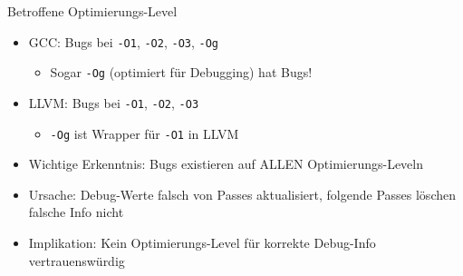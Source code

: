 ﻿\documentclass{beamer}
\begin{document}
\begin{frame}{Betroffene Optimierungs-Level}
  \begin{itemize}
    \item GCC: Bugs bei \texttt{-O1}, \texttt{-O2}, \texttt{-O3}, \texttt{-Og}
      \begin{itemize}
        \item Sogar \texttt{-Og} (optimiert f\"ur Debugging) hat Bugs!
      \end{itemize}
    \item LLVM: Bugs bei \texttt{-O1}, \texttt{-O2}, \texttt{-O3}
      \begin{itemize}
        \item \texttt{-Og} ist Wrapper f\"ur \texttt{-O1} in LLVM
      \end{itemize}
    \item Wichtige Erkenntnis: Bugs existieren auf ALLEN Optimierungs-Leveln
    \item Ursache: Debug-Werte falsch von Passes aktualisiert, folgende Passes l\"oschen falsche Info nicht
    \item Implikation: Kein Optimierungs-Level f\"ur korrekte Debug-Info vertrauensw\"urdig
  \end{itemize}
\end{frame}
\end{document}
